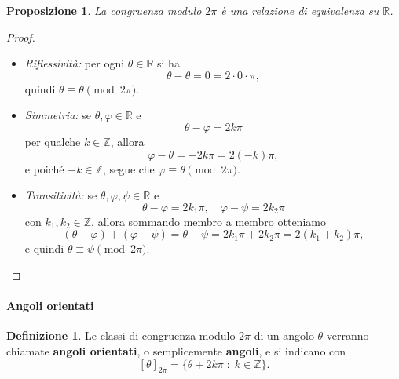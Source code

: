 \documentclass{article}
\theoremstyle{plain}
\newtheorem{prop}[thm]{Proposizione}
\theoremstyle{definition}
\newtheorem{defn}{Definizione}[section]
\theoremstyle{remark}
\begin{document}
\vspace{10pt}

\begin{bxthm}
\begin{prop}
    La congruenza modulo $2\pi$ è una relazione di equivalenza su $\mathbb{R}$.
\end{prop}
\end{bxthm}
\begin{proof}\hfill
\begin{itemize}
    \item \textit{Riflessività:} per ogni $\theta \in \mathbb{R}$ si ha
    \[
    \theta - \theta = 0 = 2 \cdot 0 \cdot \pi,
    \]
    quindi $\theta \equiv \theta \pmod{2\pi}$.

    \item \textit{Simmetria:} se $\theta, \varphi \in \mathbb{R}$ e 
    \[
    \theta - \varphi = 2k\pi
    \]
    per qualche $k \in \mathbb{Z}$, allora
    \[
    \varphi - \theta = -2k\pi = 2(-k)\pi,
    \]
    e poiché $-k \in \mathbb{Z}$, segue che $\varphi \equiv \theta \pmod{2\pi}$.

    \item \textit{Transitività:} se $\theta, \varphi, \psi \in \mathbb{R}$ e
    \[
    \theta - \varphi = 2k_1\pi, \quad \varphi - \psi = 2k_2\pi
    \]
    con $k_1, k_2 \in \mathbb{Z}$, allora sommando membro a membro otteniamo
    \[
    (\theta - \varphi) + (\varphi - \psi) = \theta - \psi = 2k_1\pi + 2k_2\pi 
    = 2(k_1 + k_2)\pi,
    \]
    e quindi $\theta \equiv \psi \pmod{2\pi}$.
\end{itemize}
\end{proof}


\vspace{10pt}

\paragraph{Angoli orientati}
\begin{bxthm}
\begin{defn}
Le classi di congruenza modulo $2\pi$ di un angolo $\theta$ verranno chiamate \textbf{angoli orientati}, o semplicemente \textbf{angoli}, 
e si indicano con
\begin{equation}\label{diciassettenove}
    [\theta]_{2\pi} = \{\theta + 2k\pi \;:\; k \in \mathbb{Z}\}.
\end{equation}
\end{defn}
\end{bxthm}
\end{document}

